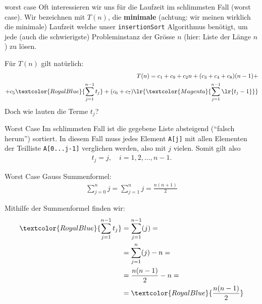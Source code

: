 \begin{frame}{worst case}
	Oft interessieren wir uns für die Laufzeit im schlimmsten Fall (worst case). Wir bezeichnen mit $T(n)$, die \textbf{minimale} (achtung: wir meinen wirklich die minimale) Laufzeit welche unser \texttt{insertionSort} Algorithmus benötigt, um jede (auch die schwierigste) Probleminstanz der Grösse $n$ (hier: Liste der Länge $n$) zu lösen.

	Für $T(n)$ gilt natürlich:
	\begin{align*}
		T(n) = c_1 + c_9 + c_2n + (c_3 + c_4 + c_8)(n-1) + \\
		+ c_5\textcolor{RoyalBlue}{\sum_{j=1}^{n-1}t_j} + (c_6 + c_7)\lr{\textcolor{Magenta}{\sum_{j=1}^{n-1}\lr{t_j - 1}}}
	\end{align*}
	Doch wie lauten die Terme $t_j$?
\end{frame}

\begin{frame}[fragile]{Worst Case}
	Im schlimmsten Fall ist die gegebene Liste absteigend (\enquote{falsch herum}) sortiert. In diesem Fall muss jedes Element \lstinline{A[j]} mit allen Elementen der Teilliste \lstinline{A[0...j-1]} verglichen werden, also mit $j$ vielen. Somit gilt also
	\begin{align*}
		t_j = j, \quad i = 1, 2, \ldots, n-1.
	\end{align*}
\end{frame}

\begin{frame}[fragile]{Worst Case}
	Gauss Summenformel:
	\begin{align*}
		\sum_{j=0}^{n} j = \sum_{j=1}^{n} j = \frac{n(n+1)}{2}
	\end{align*}
\end{frame}

\begin{frame}
	Mithilfe der Summenformel finden wir:
	\begin{align*}
		\textcolor{RoyalBlue}{\sum_{j=1}^{n-1} t_j} & = \sum_{j=1}^{n-1} (j)  =                 \\
		                                            & = \sum_{j=1}^{n} (j) - n =                \\
		                                            & = \frac{n(n-1)}{2} - n =                  \\
		                                            & = \textcolor{RoyalBlue}{\frac{n(n-1)}{2}}
	\end{align*}
\end{frame}

